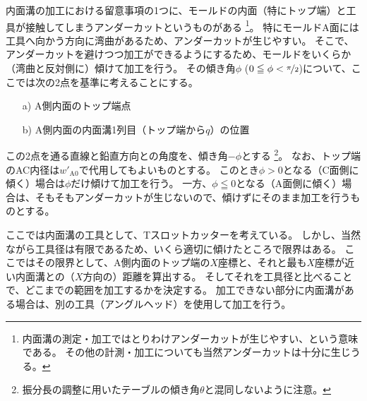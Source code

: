 \clearpage
内面溝の加工における留意事項の1つに、モールドの内面（特にトップ端）と工具が接触してしまうアンダーカットというものがある
\footnote{内面溝の測定・加工ではとりわけアンダーカットが生じやすい、という意味である。
その他の計測・加工についても当然アンダーカットは十分に生じうる。}。
特にモールドA面には工具へ向かう方向に湾曲があるため、アンダーカットが生じやすい。
そこで、アンダーカットを避けつつ加工ができるようにするため、モールドをいくらか（湾曲と反対側に）傾けて加工を行う。
その傾き角$\phi$ ($0 \leqq \phi < \nicefrac\pi2$)について、ここでは次の2点を基準に考えることにする。
\begin{tcolorbox}[title=A面の内面溝, fonttitle=\gtfamily\bfseries]
\begin{enumerate}
\item[a)]
A側内面のトップ端点
\item[b)]
A側内面の内面溝1列目（トップ端から$q$）の位置
\end{enumerate}
\end{tcolorbox}\noindent
この2点を通る直線と鉛直方向との角度を、傾き角$-\phi$とする
\footnote{振分長の調整に用いたテーブルの傾き角$\theta$と混同しないように注意。}。
なお、トップ端のAC内径は$w'_{\mathrm A0}$で代用してもよいものとする。
このとき$\phi > 0$となる（C面側に傾く）場合は$\phi$だけ傾けて加工を行う。
一方、$\phi \leqq 0$となる（A面側に傾く）場合は、そもそもアンダーカットが生じないので、傾けずにそのまま加工を行うものとする。
\begin{hosoku}
ここでは内面溝の工具として、Tスロットカッターを考えている。
しかし、当然ながら工具径は有限であるため、いくら適切に傾けたところで限界はある。
ここではその限界として、A側内面のトップ端の$X$座標と、それと最も$X$座標が近い内面溝との（$X$方向の）距離を算出する。
そしてそれを工具径と比べることで、どこまでの範囲を加工するかを決定する。
加工できない部分に内面溝がある場合は、別の工具（アングルヘッド）を使用して加工を行う。
\end{hosoku}
